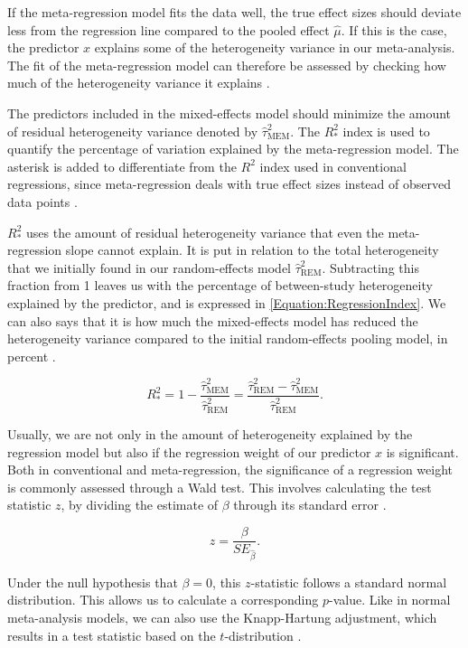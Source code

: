 \documentclass[../../../main.tex]{subfiles}
\begin{document}
If the meta-regression model fits the data well, the true effect sizes should deviate less from the regression line compared to the pooled effect $\hat{\mu}$. If this is the case, the predictor $x$ explains some of the heterogeneity variance in our meta-analysis. The fit of the meta-regression model can therefore be assessed by checking how much of the heterogeneity variance it explains \autocite{Harrer2021}.

The predictors included in the mixed-effects model should minimize the amount of residual heterogeneity variance denoted by $\hat{\tau}_\text{MEM}^2$. The $R_\ast^2$ index is used to quantify the percentage of variation explained by the meta-regression model. The asterisk is added to differentiate from the $R^2$ index used in conventional regressions, since meta-regression deals with true effect sizes instead of observed data points \autocite{Harrer2021}.

$R_\ast^2$ uses the amount of residual heterogeneity variance that even the meta-regression slope cannot explain. It is put in relation to the total heterogeneity that we initially found in our random-effects model $\hat{\tau}_\text{REM}^2$. Subtracting this fraction from 1 leaves us with the percentage of between-study heterogeneity explained by the predictor, and is expressed in \autoref{Equation:RegressionIndex}. We can also says that it is how much the mixed-effects model has reduced the heterogeneity variance compared to the initial random-effects pooling model, in percent \autocite{Harrer2021}.

\begin{equation}
R_\ast^2
= 1 - \frac{\hat{\tau}_\text{MEM}^2}{\hat{\tau}_\text{REM}^2}
= \frac{\hat{\tau}_\text{REM}^2-\hat{\tau}_\text{MEM}^2}{\hat{\tau}_\text{REM}^2}.
\label{Equation:RegressionIndex}
\end{equation}

Usually, we are not only in the amount of heterogeneity explained by the regression model but also if the regression weight of our predictor $x$ is significant. Both in conventional and meta-regression, the significance of a regression weight is commonly assessed through a Wald test. This involves calculating the test statistic $z$, by dividing the estimate of $\beta$ through its standard error \autocite{Harrer2021}.

\begin{equation}
z = \frac{\beta}{SE_{\hat{\beta}}}.
\end{equation}

Under the null hypothesis that $\beta=0$, this $z$-statistic follows a standard normal distribution. This allows us to calculate a corresponding $p$-value. Like in normal meta-analysis models, we can also use the Knapp-Hartung adjustment, which results in a test statistic based on the $t$-distribution \autocite{Harrer2021}.
\end{document}
